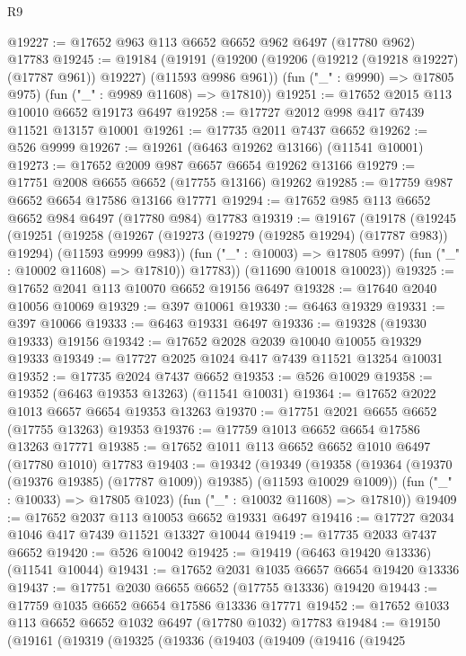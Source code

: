 \begin{lexlean}{R9}
\begin{coremodule}
@19227 := @17652 @963 @113 @6652 @6652 @962 @6497 (@17780 @962) @17783
@19245 := @19184
    (@19191
      (@19200 (@19206 (@19212 (@19218 @19227) (@17787 @961)) @19227) (@11593 @9986 @961))
      (fun ("_" : @9990) => @17805 @975)
      (fun ("_" : @9989 @11608) => @17810))
@19251 := @17652 @2015 @113 @10010 @6652 @19173 @6497
@19258 := @17727 @2012 @998 @417 @7439 @11521 @13157 @10001
@19261 := @17735 @2011 @7437 @6652
@19262 := @526 @9999
@19267 := @19261 (@6463 @19262 @13166) (@11541 @10001)
@19273 := @17652 @2009 @987 @6657 @6654 @19262 @13166
@19279 := @17751 @2008 @6655 @6652 (@17755 @13166) @19262
@19285 := @17759 @987 @6652 @6654 @17586 @13166 @17771
@19294 := @17652 @985 @113 @6652 @6652 @984 @6497 (@17780 @984) @17783
@19319 := @19167
    (@19178
      (@19245
        (@19251
          (@19258
            (@19267 (@19273 (@19279 (@19285 @19294) (@17787 @983)) @19294) (@11593 @9999 @983))
            (fun ("_" : @10003) => @17805 @997)
            (fun ("_" : @10002 @11608) => @17810))
          @17783))
      (@11690 @10018 @10023))
@19325 := @17652 @2041 @113 @10070 @6652 @19156 @6497
@19328 := @17640 @2040 @10056 @10069
@19329 := @397 @10061
@19330 := @6463 @19329
@19331 := @397 @10066
@19333 := @6463 @19331 @6497
@19336 := @19328 (@19330 @19333) @19156
@19342 := @17652 @2028 @2039 @10040 @10055 @19329 @19333
@19349 := @17727 @2025 @1024 @417 @7439 @11521 @13254 @10031
@19352 := @17735 @2024 @7437 @6652
@19353 := @526 @10029
@19358 := @19352 (@6463 @19353 @13263) (@11541 @10031)
@19364 := @17652 @2022 @1013 @6657 @6654 @19353 @13263
@19370 := @17751 @2021 @6655 @6652 (@17755 @13263) @19353
@19376 := @17759 @1013 @6652 @6654 @17586 @13263 @17771
@19385 := @17652 @1011 @113 @6652 @6652 @1010 @6497 (@17780 @1010) @17783
@19403 := @19342
    (@19349
      (@19358 (@19364 (@19370 (@19376 @19385) (@17787 @1009)) @19385) (@11593 @10029 @1009))
      (fun ("_" : @10033) => @17805 @1023)
      (fun ("_" : @10032 @11608) => @17810))
@19409 := @17652 @2037 @113 @10053 @6652 @19331 @6497
@19416 := @17727 @2034 @1046 @417 @7439 @11521 @13327 @10044
@19419 := @17735 @2033 @7437 @6652
@19420 := @526 @10042
@19425 := @19419 (@6463 @19420 @13336) (@11541 @10044)
@19431 := @17652 @2031 @1035 @6657 @6654 @19420 @13336
@19437 := @17751 @2030 @6655 @6652 (@17755 @13336) @19420
@19443 := @17759 @1035 @6652 @6654 @17586 @13336 @17771
@19452 := @17652 @1033 @113 @6652 @6652 @1032 @6497 (@17780 @1032) @17783
@19484 := @19150
    (@19161
      (@19319
        (@19325
          (@19336
            (@19403
              (@19409
                (@19416
                  (@19425

\end{coremodule}
\end{lexlean}
